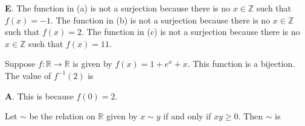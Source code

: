 \documentclass[addpoints]{exam}
\begin{document}
\begin{questions}
\begin{solution}
	\textbf{E}. The function in (a) is not a surjection because there is no $x \in \mathbb{Z}$ such that $f(x) = -1$. The function in (b) is not a surjection because there is no $x \in \mathbb{Z}$ such that $f(x) = 2$. The function in (c) is not a surjection because there is no $x \in \mathbb{Z}$ such that $f(x) = 11$. 
\end{solution}


\question[2] Suppose $f: \mathbb{R} \rightarrow \mathbb{R}$ is given by $f(x) = 1 + e^x + x$. This function is a bijection. The value of $f^{-1}(2)$ is 

\begin{solution}
	\textbf{A}. This is because $f(0) = 2$. 
\end{solution}


\question[2] Let $\sim$ be the relation on $\mathbb{R}$ given by $x \sim y$ if and only if $xy \geq 0$. Then $\sim$ is 
\end{questions}
\end{document}
